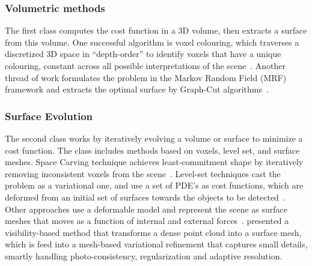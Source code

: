 \subsubsection{Volumetric methods}
The first class computes the cost function in a 3D volume, then extracts a surface from this volume. One successful algorithm is voxel colouring, which traverses a discretized 3D space in “depth-order” to identify voxels that have a unique colouring, constant across all possible interpretations of the scene~\cite{seitz1997photorealistic}. Another thread of work formulates the problem in the Markov Random Field (MRF) framework and extracts the optimal surface by Graph-Cut algorithms~\cite{roy1998maximum,vogiatzis2005multi,vogiatzis2007multiview}.

\subsubsection{Surface Evolution}
The second class works by iteratively evolving a volume or surface to minimize a cost function. The class includes methods based on voxels, level set, and surface meshes. Space Carving technique achieves least-commitment shape \cite{marr1982vision} by iteratively removing inconsistent voxels from the scene~\cite{kutulakos2000theory}. Level-set techniques cast the problem as a variational one, and use a set of PDE's as cost functions, which are deformed from an initial set of surfaces towards the objects to be detected~\cite{faugeras2002variational}. Other approaches use a deformable model and represent the scene as surface meshes that moves as a function of internal and external forces~\cite{esteban2004silhouette}. \citeauthor{hiep2009towards} presented a visibility-based method that transforms a dense point cloud into a surface mesh, which is feed into a mesh-based variational refinement that captures small details, smartly handling photo-consistency, regularization and adaptive resolution.


